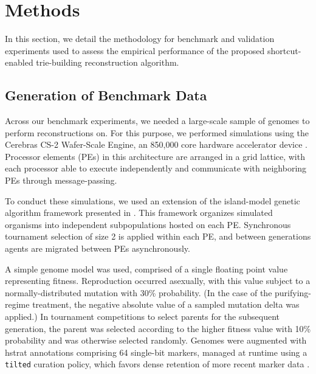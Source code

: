 \section{Methods} \label{sec:methods}

In this section, we detail the methodology for benchmark and validation experiments used to assess the empirical performance of the proposed shortcut-enabled trie-building reconstruction algorithm.

\subsection{Generation of Benchmark Data}

Across our benchmark experiments, we needed a large-scale sample of genomes to perform reconstructions on.
For this purpose, we performed simulations using the Cerebras CS-2
Wafer-Scale Engine, an 850,000 core hardware accelerator device \citep{lie2023cerebras}.
Processor elements (PEs) in this architecture are arranged in a grid lattice, with each processor able to execute independently and communicate with neighboring PEs through message-passing.

To conduct these simulations, we used an extension of the island-model genetic algorithm framework presented in \citep{moreno2024trackable}.
This framework organizes simulated organisms into independent subpopulations hosted on each PE.
Synchronous tournament selection of size 2 is applied within each PE, and between generations agents are migrated between PEs asynchronously.


A simple genome model was used, comprised of a single floating point value representing fitness.
Reproduction occurred asexually, with this value subject to a normally-distributed mutation with 30\% probability.
(In the case of the purifying-regime treatment, the negative absolute value of a sampled mutation delta was applied.)
In tournament competitions to select parents for the subsequent generation, the parent was selected according to the higher fitness value with 10\% probability and was otherwise selected randomly.
Genomes were augmented with hstrat annotations comprising 64 single-bit markers, managed at runtime using a \texttt{tilted} curation policy, which favors dense retention of more recent marker data \citep{moreno2024structured}.

